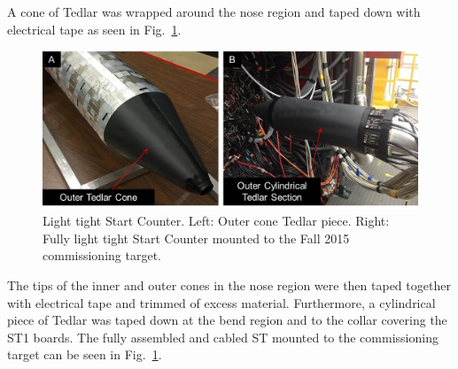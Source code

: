 A cone of Tedlar was wrapped around the nose region and taped down with electrical tape as seen in Fig.~\ref{fig:light_tight_st}. 
\begin{figure}[!htb]
	\centering
	\includegraphics[width=1.0\columnwidth]{fabrication/figs/st_lt}
	\caption{Light tight Start Counter.  Left: Outer cone Tedlar piece.  Right: Fully light tight Start Counter mounted to the Fall 2015 commissioning target.}
	\label{fig:light_tight_st}
\end{figure}
The tips of the inner and outer cones in the nose region were then taped together with electrical tape and trimmed of excess material. Furthermore, a cylindrical piece of Tedlar was taped down at the bend region and to the collar covering the ST1 boards.  The fully assembled and cabled ST mounted to the commissioning target can be seen in Fig.~\ref{fig:light_tight_st}. 











